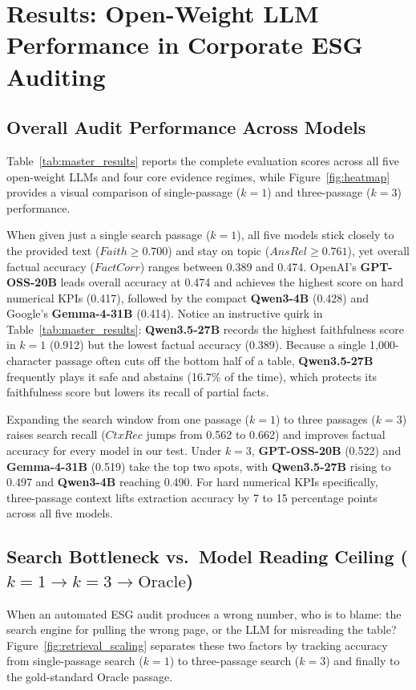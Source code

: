 \documentclass[11pt,letterpaper]{article}
\newcommand{\model}[1]{\textbf{#1}}
\newcommand{\mi}[1]{\mathit{#1}}
\begin{document}
\section{Results: Open-Weight LLM Performance in Corporate ESG Auditing}
\label{sec:results}

\subsection{Overall Audit Performance Across Models}
Table~\ref{tab:master_results} reports the complete evaluation scores across all five open-weight LLMs and four core evidence regimes, while Figure~\ref{fig:heatmap} provides a visual comparison of single-passage ($k=1$) and three-passage ($k=3$) performance.

When given just a single search passage ($k=1$), all five models stick closely to the provided text ($\mi{Faith} \ge 0.700$) and stay on topic ($\mi{AnsRel} \ge 0.761$), yet overall factual accuracy ($\mi{FactCorr}$) ranges between 0.389 and 0.474. OpenAI's \model{GPT-OSS-20B} leads overall accuracy at 0.474 and achieves the highest score on hard numerical KPIs (0.417), followed by the compact \model{Qwen3-4B} (0.428) and Google's \model{Gemma-4-31B} (0.414). Notice an instructive quirk in Table~\ref{tab:master_results}: \model{Qwen3.5-27B} records the highest faithfulness score in $k=1$ (0.912) but the lowest factual accuracy (0.389). Because a single 1,000-character passage often cuts off the bottom half of a table, \model{Qwen3.5-27B} frequently plays it safe and abstains (16.7\% of the time), which protects its faithfulness score but lowers its recall of partial facts.

Expanding the search window from one passage ($k=1$) to three passages ($k=3$) raises search recall ($\mi{CtxRec}$ jumps from 0.562 to 0.662) and improves factual accuracy for every model in our test. Under $k=3$, \model{GPT-OSS-20B} (0.522) and \model{Gemma-4-31B} (0.519) take the top two spots, with \model{Qwen3.5-27B} rising to 0.497 and \model{Qwen3-4B} reaching 0.490. For hard numerical KPIs specifically, three-passage context lifts extraction accuracy by 7 to 15 percentage points across all five models.

\subsection{Search Bottleneck vs.\ Model Reading Ceiling \texorpdfstring{($k=1 \to k=3 \to \text{Oracle}$)}{(k=1 -> k=3 -> Oracle)}}
When an automated ESG audit produces a wrong number, who is to blame: the search engine for pulling the wrong page, or the LLM for misreading the table? Figure~\ref{fig:retrieval_scaling} separates these two factors by tracking accuracy from single-passage search ($k=1$) to three-passage search ($k=3$) and finally to the gold-standard Oracle passage.
\end{document}
